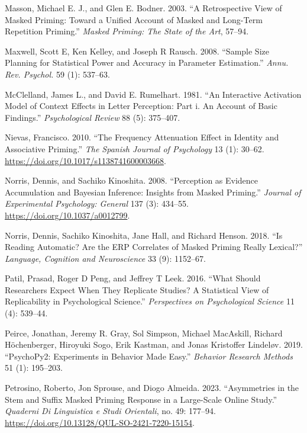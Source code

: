 \documentclass[
]{interact}
\newlength{\cslhangindent}
\newenvironment{CSLReferences}[2] %
 {\begin{list}{}{%
  \setlength{\itemindent}{0pt}
  \setlength{\leftmargin}{0pt}
  \setlength{\parsep}{0pt}
  \ifodd #1
   \setlength{\leftmargin}{\cslhangindent}
   \setlength{\itemindent}{-1\cslhangindent}
  \fi
  \setlength{\itemsep}{#2\baselineskip}}}
 {\end{list}}
\begin{document}
\begin{CSLReferences}{1}{0}
Masson, Michael E. J., and Glen E. Bodner. 2003. {``A Retrospective View
of Masked Priming: Toward a Unified Account of Masked and Long-Term
Repetition Priming.''} \emph{Masked Priming: The State of the Art},
57--94.

Maxwell, Scott E, Ken Kelley, and Joseph R Rausch. 2008. {``Sample Size
Planning for Statistical Power and Accuracy in Parameter Estimation.''}
\emph{Annu. Rev. Psychol.} 59 (1): 537--63.

McClelland, James L., and David E. Rumelhart. 1981. {``An Interactive
Activation Model of Context Effects in Letter Perception: Part i. An
Account of Basic Findings.''} \emph{Psychological Review} 88 (5):
375--407.

Nievas, Francisco. 2010. {``The Frequency Attenuation Effect in Identity
and Associative Priming.''} \emph{The Spanish Journal of Psychology} 13
(1): 30--62. \url{https://doi.org/10.1017/s1138741600003668}.

Norris, Dennis, and Sachiko Kinoshita. 2008. {``Perception as Evidence
Accumulation and Bayesian Inference: Insights from Masked Priming.''}
\emph{Journal of Experimental Psychology: General} 137 (3): 434--55.
\url{https://doi.org/10.1037/a0012799}.

Norris, Dennis, Sachiko Kinoshita, Jane Hall, and Richard Henson. 2018.
{``Is Reading Automatic? Are the ERP Correlates of Masked Priming Really
Lexical?''} \emph{Language, Cognition and Neuroscience} 33 (9):
1152--67.

Patil, Prasad, Roger D Peng, and Jeffrey T Leek. 2016. {``What Should
Researchers Expect When They Replicate Studies? A Statistical View of
Replicability in Psychological Science.''} \emph{Perspectives on
Psychological Science} 11 (4): 539--44.

Peirce, Jonathan, Jeremy R. Gray, Sol Simpson, Michael MacAskill,
Richard Höchenberger, Hiroyuki Sogo, Erik Kastman, and Jonas Kristoffer
Lindeløv. 2019. {``PsychoPy2: Experiments in Behavior Made Easy.''}
\emph{Behavior Research Methods} 51 (1): 195--203.

Petrosino, Roberto, Jon Sprouse, and Diogo Almeida. 2023. {``Asymmetries
in the Stem and Suffix Masked Priming Response in a Large-Scale Online
Study.''} \emph{Quaderni Di Linguistica e Studi Orientali}, no. 49:
177--94. \url{https://doi.org/10.13128/QUL-SO-2421-7220-15154}.


\end{CSLReferences}
\end{document}
